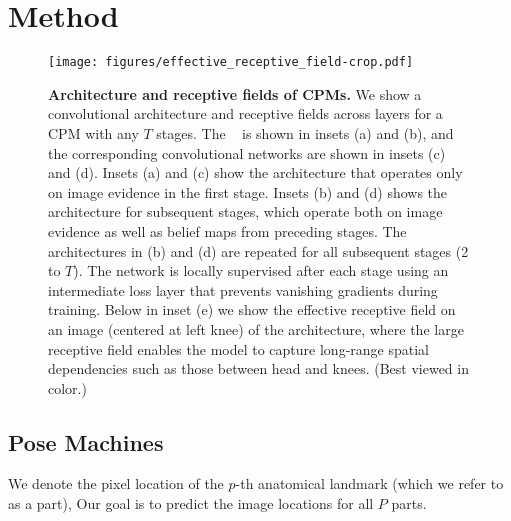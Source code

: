 \documentclass[10pt,twocolumn,letterpaper]{article}
\begin{document}
\section{Method}\begin{figure*}[t!]
    \centering
    \texttt{[image: figures/effective\_receptive\_field-crop.pdf]}
    \caption{\textbf{Architecture and receptive fields of CPMs.} We show a convolutional architecture and receptive fields across layers for a CPM with any $T$ stages. The \posemachine~\cite{Ramakrishna2014posemachines} is shown in insets (a) and (b), and the corresponding convolutional networks are shown in insets (c) and (d). Insets (a) and (c) show the architecture that operates only on image evidence in the first stage. Insets (b) and (d) shows the architecture for subsequent stages, which operate both on image evidence as well as belief maps from preceding stages. The architectures in (b) and (d) are repeated for all subsequent stages (2 to $T$). The network is locally supervised after each stage using an intermediate loss layer that prevents vanishing gradients during training. Below in inset (e) we show the effective receptive field on an image (centered at left knee) of the architecture, where the large receptive field enables the model to capture long-range spatial dependencies such as those between head and knees. (Best viewed in color.)}
    \label{fig:arch_half}
\end{figure*}\subsection{Pose Machines}
We denote the pixel location of the $p$-th anatomical landmark (which we refer to as a part),
Our goal is to predict the image locations 
for all $P$ parts. 
\end{document}

